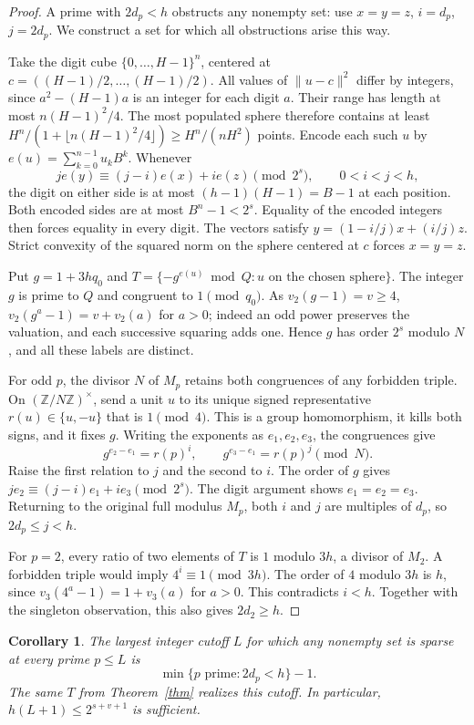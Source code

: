 \documentclass[11pt]{article}
\newtheorem{corollary}[theorem]{Corollary}
\newcommand{\Z}{\mathbb Z}
\begin{document}
\begin{proof}
A prime with $2d_p<h$ obstructs any nonempty set: use $x=y=z$,
$i=d_p$, $j=2d_p$. We construct a set for which all obstructions arise this way.

Take the digit cube $\{0,\ldots,H-1\}^n$, centered at
$c=((H-1)/2,\dots,(H-1)/2)$. All values of $\|u-c\|^2$ differ by integers,
since $a^2-(H-1)a$ is an integer for each digit $a$. Their range has length
at most $n(H-1)^2/4$. The most populated sphere therefore contains
at least $H^n/(1+\lfloor n(H-1)^2/4\rfloor)\ge H^n/(nH^2)$ points.
Encode each such $u$ by $e(u)=\sum_{k=0}^{n-1}u_k B^k$. Whenever
\[
j e(y)\equiv(j-i)e(x)+i e(z)\pmod{2^s},\qquad 0<i<j<h,
\]
the digit on either side is at most $(h-1)(H-1)=B-1$ at each position.
Both encoded sides are at most $B^n-1<2^s$. Equality of the encoded integers
then forces equality in every digit. The vectors satisfy
$y=(1-i/j)x+(i/j)z$. Strict convexity of the squared norm on the sphere
centered at $c$ forces $x=y=z$.

Put $g=1+3hq_0$ and $T=\{-g^{e(u)}\bmod Q: u\text{ on the chosen sphere}\}$.
The integer $g$ is prime to $Q$ and congruent to $1\pmod{q_0}$.
As $v_2(g-1)=v\ge4$,
$v_2(g^a-1)=v+v_2(a)$ for $a>0$; indeed an odd power preserves the
valuation, and each successive squaring adds one. Hence $g$ has order $2^s$
modulo $N$, and all these labels are distinct.

For odd $p$, the divisor $N$ of $M_p$ retains both congruences of any
forbidden triple. On $(\Z/N\Z)^\times$, send a unit $u$ to its unique signed
representative $r(u)\in\{u,-u\}$ that is $1\pmod4$. This is a group
homomorphism, it kills both signs, and it fixes $g$. Writing the exponents
as $e_1,e_2,e_3$, the congruences give
\[
 g^{e_2-e_1}=r(p)^i,\qquad g^{e_3-e_1}=r(p)^j\pmod N.
\]
Raise the first relation to $j$ and the second to $i$. The order of $g$
gives $j e_2\equiv(j-i)e_1+i e_3\pmod{2^s}$. The digit argument shows
$e_1=e_2=e_3$. Returning to the original full modulus $M_p$, both $i$ and
$j$ are multiples of $d_p$, so $2d_p\le j<h$.

For $p=2$, every ratio of two elements of $T$ is $1$ modulo $3h$, a divisor
of $M_2$. A forbidden triple would imply $4^i\equiv1\pmod{3h}$. The order of
$4$ modulo $3h$ is $h$, since $v_3(4^a-1)=1+v_3(a)$ for $a>0$.
This contradicts $i<h$. Together with the singleton observation, this also
gives $2d_2\ge h$.
\end{proof}

\begin{corollary}\label{cut}
The largest integer cutoff $L$ for which any nonempty set is sparse at every
prime $p\le L$ is
\[
\min\{p\text{ prime}:2d_p<h\}-1.
\]
The same $T$ from Theorem~\ref{thm} realizes this cutoff. In particular,
$h(L+1)\le2^{s+v+1}$ is sufficient.
\end{corollary}
\end{document}
